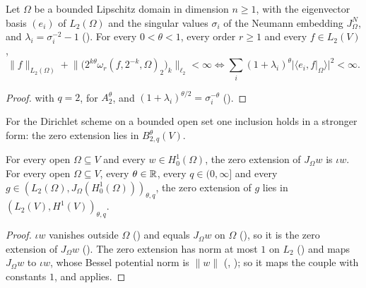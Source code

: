 \begin{corollary}
\label{cor:spectral-sobolev-neumann}
\leanok
{}
Let $\Omega$ be a bounded Lipschitz domain in dimension $n \geq 1$, with the eigenvector basis
$(e_i)$ of $L_2(\Omega)$ and the singular values $\sigma_i$ of the Neumann embedding $J^N_\Omega$,
and $\lambda_i = \sigma_i^{-2} - 1$ (). For every $0 < \theta < 1$,
every order $r \geq 1$ and every $f \in L_2(V)$,
\[
  \|f\|_{L_2(\Omega)} + \bigl\| \bigl(2^{k\theta} \omega_r(f, 2^{-k}, \Omega)_2\bigr)_k
    \bigr\|_{\ell_2} < \infty
  \iff \sum_i (1 + \lambda_i)^\theta |\langle e_i, f|_\Omega \rangle|^2 < \infty .
\]
\end{corollary}

\begin{proof}
\leanok
{} with $q = 2$,  for
$A^\theta_2$, and $(1 + \lambda_i)^{\theta/2} = \sigma_i^{-\theta}$ ().
\end{proof}

For the Dirichlet scheme on a bounded open set one inclusion holds in a stronger form: the zero
extension lies in $B^\theta_{2,q}(V)$.

\begin{lemma}
\label{lem:dirichlet-zero-extension}
\leanok
{}
For every open $\Omega \subseteq V$ and every $w \in H^1_0(\Omega)$, the zero extension of
$J_\Omega w$ is $\iota w$. For every open $\Omega \subseteq V$, every $\theta \in \mathbb{R}$, every
$q \in (0, \infty]$ and every $g \in (L_2(\Omega), J_\Omega(H^1_0(\Omega)))_{\theta, q}$, the
zero extension of $g$ lies in $(L_2(V), H^1(V))_{\theta, q}$.
\end{lemma}

\begin{proof}
\leanok
$\iota w$ vanishes outside $\Omega$ () and equals $J_\Omega w$ on
$\Omega$ (), so it is the zero extension of $J_\Omega w$
(). The zero extension has norm at most $1$ on $L_2$
() and maps $J_\Omega w$ to $\iota w$, whose Bessel potential norm
is $\|w\|$ (, ); so it maps the couple
with constants $1$, and  applies.
\end{proof}

